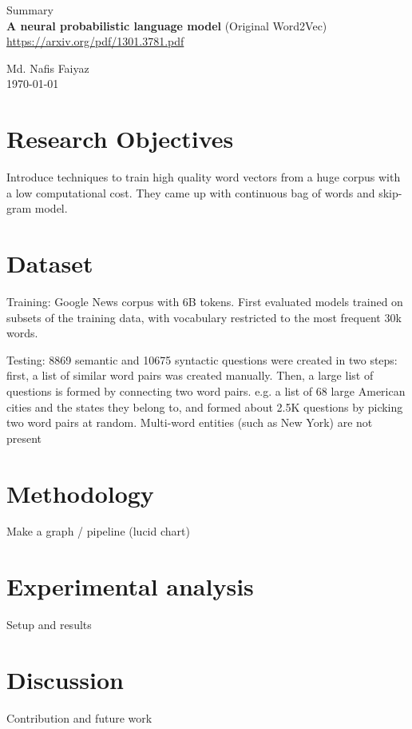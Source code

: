 \documentclass{article}
\begin{document}
\begin{titlepage}

    \begin{center}
        
        {\LARGE
            Summary\\
            \vspace{0.5cm}
            \textbf{A neural probabilistic language model} (Original Word2Vec)
        }\\
        \vspace{1cm}
        \url{https://arxiv.org/pdf/1301.3781.pdf}
        
        \vfill
        
        {\large Md. Nafis Faiyaz}\\
        \today
        
    \end{center}
    
\end{titlepage}

\section{Research Objectives}
    Introduce techniques to train high quality word vectors from a huge corpus with a low computational cost. They came up with continuous bag of words and skip-gram model.
    
\section{Dataset}
    Training: Google News corpus with 6B tokens. First evaluated models trained on subsets of the training data, with vocabulary restricted to the most frequent 30k words. 
    
    Testing: 8869 semantic and 10675 syntactic questions were created in two steps: ﬁrst, a list of similar word pairs was created manually. Then, a large list of questions is formed by connecting two word pairs. e.g. a list of 68 large American cities and the states they belong to, and formed about 2.5K questions by picking two word pairs at random. Multi-word entities (such as New York) are not present
    
\section{Methodology}
    Make a graph / pipeline (lucid chart)
    
\section{Experimental analysis}
    Setup and results
    
\section{Discussion}
    Contribution and future work    
\end{document}
